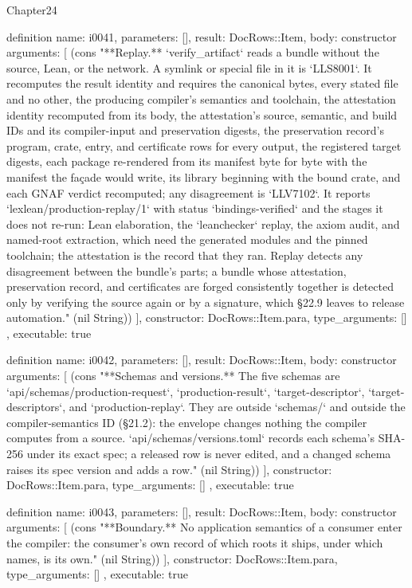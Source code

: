 \begin{lexlean}{Chapter24}
\begin{semanticmodule}
definition{
  name: i0041,
  parameters: [],
  result: DocRows::Item,
  body: constructor{
    arguments: [
      (cons "**Replay.** `verify_artifact` reads a bundle without the source, Lean, or the network. A symlink or special file in it is `LLS8001`. It recomputes the result identity and requires the canonical bytes, every stated file and no other, the producing compiler's semantics and toolchain, the attestation identity recomputed from its body, the attestation's source, semantic, and build IDs and its compiler-input and preservation digests, the preservation record's program, crate, entry, and certificate rows for every output, the registered target digests, each package re-rendered from its manifest byte for byte with the manifest the façade would write, its library beginning with the bound crate, and each GNAF verdict recomputed; any disagreement is `LLV7102`. It reports `lexlean/production-replay/1` with status `bindings-verified` and the stages it does not re-run: Lean elaboration, the `leanchecker` replay, the axiom audit, and named-root extraction, which need the generated modules and the pinned toolchain; the attestation is the record that they ran. Replay detects any disagreement between the bundle's parts; a bundle whose attestation, preservation record, and certificates are forged consistently together is detected only by verifying the source again or by a signature, which §22.9 leaves to release automation." (nil String))
    ],
    constructor: DocRows::Item.para,
    type_arguments: []
  },
  executable: true
}

definition{
  name: i0042,
  parameters: [],
  result: DocRows::Item,
  body: constructor{
    arguments: [
      (cons "**Schemas and versions.** The five schemas are `api/schemas/production-request`, `production-result`, `target-descriptor`, `target-descriptors`, and `production-replay`. They are outside `schemas/` and outside the compiler-semantics ID (§21.2): the envelope changes nothing the compiler computes from a source. `api/schemas/versions.toml` records each schema's SHA-256 under its exact spec; a released row is never edited, and a changed schema raises its spec version and adds a row." (nil String))
    ],
    constructor: DocRows::Item.para,
    type_arguments: []
  },
  executable: true
}

definition{
  name: i0043,
  parameters: [],
  result: DocRows::Item,
  body: constructor{
    arguments: [
      (cons "**Boundary.** No application semantics of a consumer enter the compiler: the consumer's own record of which roots it ships, under which names, is its own." (nil String))
    ],
    constructor: DocRows::Item.para,
    type_arguments: []
  },
  executable: true
}


\end{semanticmodule}
\end{lexlean}
